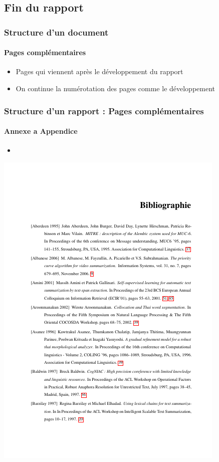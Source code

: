 \documentclass[xcolor=table]{beamer}
\begin{document}
\subsection{Fin du rapport}

\begin{frame}
\frametitle{Structure d'un document}
\framesubtitle{Pages complémentaires}

\begin{itemize}
	\item Pages qui viennent après le développement du rapport
	\item On continue la numérotation des pages comme le développement
\end{itemize}

\end{frame}

\begin{frame}
\frametitle{Structure d'un rapport : Pages complémentaires}
\framesubtitle{Annexe a Appendice}

\begin{minipage}{0.52\textwidth}
	\begin{itemize}
		\item 
	\end{itemize}
\end{minipage}
\begin{minipage}{0.42\textwidth}
	\includegraphics[width=\textwidth]{..//img/Bweb03-redaction/bibliographie.png}
\end{minipage}

\end{frame}
\end{document}
